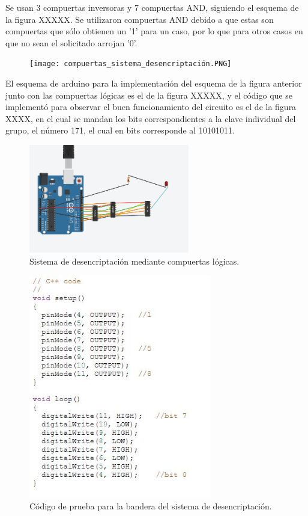 \documentclass{article}
\begin{document}
Se usan 3 compuertas inversoras y 7 compuertas AND, siguiendo el esquema de la figura XXXXX. Se utilizaron compuertas AND debido a que estas son compuertas que sólo obtienen un '1' para un caso, por lo que para otros casos en que no sean el solicitado arrojan '0'.


\begin{figure}[h]
\texttt{[image: compuertas\_sistema\_desencriptación.PNG]}
\centering
\caption{}
\label{fig:compuertas_sistema_desencriptación.PNG}
\end{figure}



El esquema de arduino para la implementación del esquema de la figura anterior junto con las compuertas lógicas es el de la figura XXXXX, y el código que se implementó para observar el buen funcionamiento del circuito es el de la figura XXXX, en el cual se mandan los bits correspondientes a la clave individual del grupo, el número 171, el cual en bits corresponde al 10101011.


\begin{figure}[h]
\includegraphics[width=7cm]{sistema_desencriptacion.PNG}
\centering
\caption{Sistema de desencriptación mediante compuertas lógicas.}
\label{fig:sistema_desencriptacion.PNG}
\end{figure}

\begin{figure}[h]
\includegraphics[width=8cm]{Desencrip1.JPG}
\centering
\caption{Código de prueba para la bandera del sistema de desencriptación.}
\label{fig:Desencrip1.PNG}
\end{figure}
\end{document}
